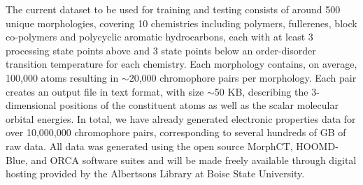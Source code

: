 \documentclass[12pt]{article}
\begin{document}
The current dataset to be used for training and testing consists of around 500 unique morphologies, covering 10 chemistries including polymers, fullerenes, block co-polymers and polycyclic aromatic hydrocarbons, each with at least 3 processing state points above and 3 state points below an order-disorder transition temperature for each chemistry.
Each morphology contains, on average, 100,000 atoms resulting in $\sim$20,000 chromophore pairs per morphology.
Each pair creates an output file in text format, with size $\sim$50 KB, describing the 3-dimensional positions of the constituent atoms as well as the scalar molecular orbital energies.
In total, we have already generated electronic properties data for over 10,000,000 chromophore pairs, corresponding to several hundreds of GB of raw data.
All data was generated using the open source MorphCT\cite{MorphCT,Jones2017}, HOOMD-Blue\cite{Anderson08}, and ORCA\cite{Neese2012b} software suites and will be made freely available through digital hosting provided by the Albertsons Library at Boise State University.

\newpage




\end{document}
